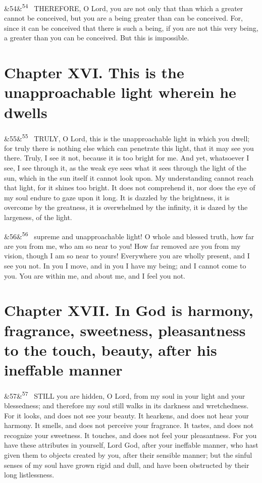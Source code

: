 \documentclass[12pt]{article}
\newcommand{\para}[1][]{\par\noindent\ifx&#1&\else\textsuperscript{\footnotesize #1}~\fi}
\begin{document}
\para[54] THEREFORE, O Lord, you are not only that than which a greater cannot be conceived, but you are a being greater than can be conceived. For, since it can be conceived that there is such a being, if you are not this very being, a greater than you can be conceived. But this is impossible.


\section*{Chapter XVI. This is the unapproachable light wherein he dwells}

\para[55] TRULY, O Lord, this is the unapproachable light in which you dwell; for truly there is nothing else which can penetrate this light, that it may see you there. Truly, I see it not, because it is too bright for me. And yet, whatsoever I see, I see through it, as the weak eye sees what it sees through the light of the sun, which in the sun itself it cannot look upon. My understanding cannot reach that light, for it shines too bright. It does not comprehend it, nor does the eye of my soul endure to gaze upon it long. It is dazzled by the brightness, it is overcome by the greatness, it is overwhelmed by the infinity, it is dazed by the largeness, of the light.

\para[56] 0 supreme and unapproachable light! O whole and blessed truth, how far are you from me, who am so near to you! How far removed are you from my vision, though I am so near to yours! Everywhere you are wholly present, and I see you not. In you I move, and in you I have my being; and I cannot come to you. You are within me, and about me, and I feel you not.


\section*{Chapter XVII. In God is harmony, fragrance, sweetness, pleasantness to the touch, beauty, after his ineffable manner}

\para[57] STILL you are hidden, O Lord, from my soul in your light and your blessedness; and therefore my soul still walks in its darkness and wretchedness. For it looks, and does not see your beauty. It hearkens, and does not hear your harmony. It smells, and does not perceive your fragrance. It tastes, and does not recognize your sweetness. It touches, and does not feel your pleasantness. For you have these attributes in yourself, Lord God, after your ineffable manner, who hast given them to objects created by you, after their sensible manner; but the sinful senses of my soul have grown rigid and dull, and have been obstructed by their long listlessness.
\end{document}
